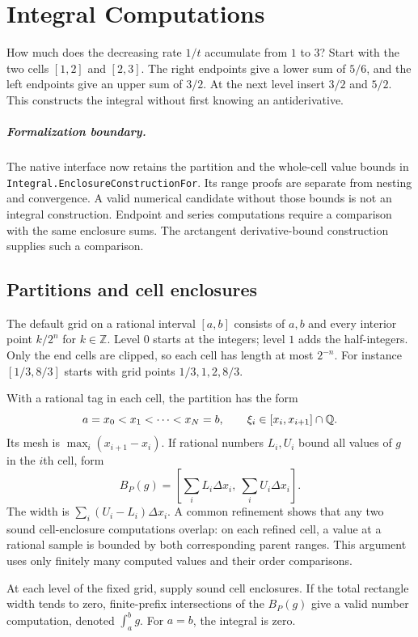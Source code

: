 \chapter{Integral Computations}\label{ch:integrals}

How much does the decreasing rate $1/t$ accumulate from $1$ to $3$?
Start with the two cells $[1,2]$ and $[2,3]$. The right endpoints give
a lower sum of $5/6$, and the left endpoints give an upper sum of $3/2$.
At the next level insert $3/2$ and $5/2$. This constructs the integral
without first knowing an antiderivative.

\paragraph{Formalization boundary.}
The native interface now retains the partition and the whole-cell value
bounds in \texttt{Integral.EnclosureConstructionFor}. Its range proofs
are separate from nesting and convergence. A valid numerical candidate
without those bounds is not an integral construction. Endpoint and series
computations require a comparison with the same enclosure sums. The
arctangent derivative-bound construction supplies such a comparison.

\section{Partitions and cell enclosures}
The default grid on a rational interval $[a,b]$ consists of $a,b$
and every interior point $k/2^n$ for $k\in\mathbb Z$. Level $0$ starts
at the integers; level $1$ adds the half-integers. Only the end cells
are clipped, so each cell has length at most $2^{-n}$. For instance
$[1/3,8/3]$ starts with grid points $1/3,1,2,8/3$.

With a rational tag in each cell, the partition has the form
\[
 a=x_0<x_1<\cdots<x_N=b,\qquad
 \xi_i\in[x_i,x_{i+1}]\cap\mathbb{Q}.
\]
Its mesh is $\max_i(x_{i+1}-x_i)$.  If rational numbers $L_i,U_i$ bound all
values of $g$ in the $i$th cell, form
\[
 B_P(g)=\left[\sum_i L_i\Delta x_i,\ \sum_i U_i\Delta x_i\right].
\]
The width is $\sum_i(U_i-L_i)\Delta x_i$.  A common refinement shows that
any two sound cell-enclosure computations overlap: on each refined cell,
a value at a rational sample is bounded by both corresponding parent
ranges.  This argument uses only finitely many computed values and their
order comparisons.

\begin{definition}\label{def:integral-computation}
At each level of the fixed grid, supply sound cell enclosures. If the
total rectangle width tends to zero, finite-prefix intersections of the
$B_P(g)$ give a valid number computation, denoted $\int_a^b g$.
For $a=b$, the integral is zero.
\end{definition}


